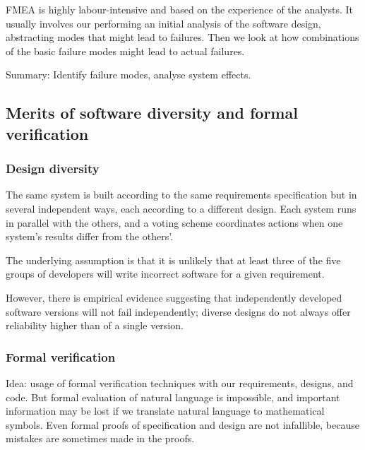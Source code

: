 FMEA is highly labour-intensive and based on the experience of the analysts. It usually involves our performing an initial analysis of the software design, abstracting modes that might lead to failures. Then we look at how combinations of the basic failure modes might lead to actual failures. \newline

Summary: Identify failure modes, analyse system effects.

\subsection{Merits of software diversity and formal verification}

\subsubsection{Design diversity}
The same system is built according to the same requirements specification but in several independent ways, each according to a different design. Each system runs in parallel with the others, and a voting scheme coordinates actions when one system’s results differ from the others’. \newline

The underlying assumption is that it is unlikely that at least three of the five groups of developers will write incorrect software for a given requirement. \newline

However, there is empirical evidence suggesting that independently developed software versions will not fail independently; diverse designs do not always offer reliability higher than of a single version.

\subsubsection{Formal verification}

Idea: usage of formal verification techniques with our requirements, designs, and code. \newline
But formal evaluation of natural language is impossible, and important information may be lost if we translate natural language to mathematical symbols. Even formal proofs of specification and design are not infallible, because mistakes are sometimes made in the proofs.
